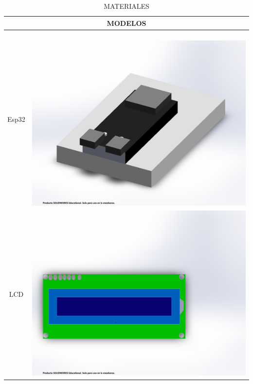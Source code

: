     \begin{table}[H]
        \centering
        \caption{MATERIALES}
        \begin{tabular}{|c |c |}
        \hline
        \multicolumn{2}{c}{MODELOS}\\
        \hline
             Esp32& \ \includegraphics[scale=0.1]{9/Img/piezaEsp32.pdf}\\
        \hline
             LCD& \includegraphics[scale=0.1]{9/Img/piezaLcd.pdf}   \\
        \hline

\end{tabular}
\end{table}
